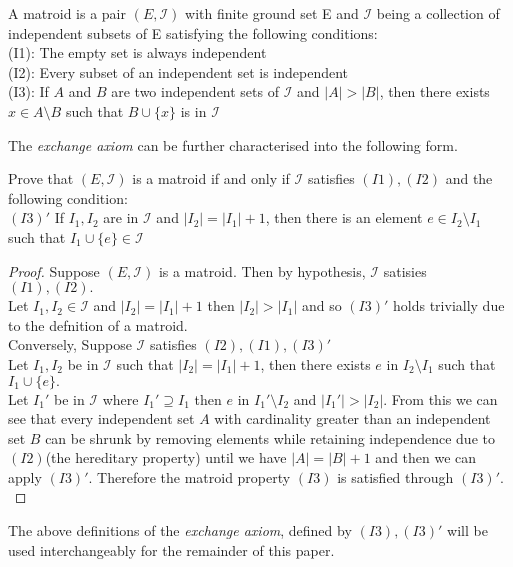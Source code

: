 \documentclass[../main.tex]{subfiles}
\begin{document}
\begin{defn}
A matroid is a pair $(E,\mathcal{I})$ with finite ground set E and $\mathcal{I}$ being a collection of independent subsets of E satisfying the following conditions:\\
\noindent (I1): The empty set is always independent\\
\noindent (I2): Every subset of an independent set is independent\\
\noindent (I3): If $ A $ and $ B $ are two independent sets of $\mathcal{I}$ and $|A|>|B|$, then there exists $x \in A \setminus B$ such that $B \cup \{ x \}$ is in $\mathcal{I}$
\end{defn}
The \textit{exchange axiom} can be further characterised into the following form.
\begin{lem}
Prove that $(E,\mathcal{I})$ is a matroid if and only if $\mathcal{I}$ satisfies $(I1), (I2)$ and the following condition:\\
\noindent $(I3)'$ If $I_1,I_2$ are in $\mathcal{I}$ and $|I_2|=|I_1|+1$, then there is an element $e \in I_2 \setminus I_1$ such that $I_1 \cup \{e\} \in \mathcal{I}$
\end{lem}
\begin{proof}
Suppose $(E,\mathcal{I})$ is a matroid. Then by hypothesis, $\mathcal{I}$ satisies $(I1),(I2).$\\
\noindent Let $I_1,I_2 \in \mathcal{I}$ and $|I_2|=|I_1|+1$ then $|I_2|>|I_1|$ and so $(I3)'$ holds trivially due to the defnition of a matroid.\\
Conversely, Suppose $\mathcal{I}$ satisfies $(I2),(I1),(I3)'$\\
Let $I_1,I_2$ be in $\mathcal{I}$ such that $|I_2|=|I_1|+1$, then there exists $e$ in $I_2 \setminus I_1$ such that $I_1 \cup \{e\}.$\\
Let $I_1'$ be in $\mathcal{I}$ where $I_1' \supseteq I_1$ then $e$ in $I_1' \setminus I_2$ and $|I_1'|>|I_2|.$ From this we can see that every independent set $A$ with cardinality greater than an independent set $B$ can be shrunk by removing elements while retaining independence due to $(I2)$(the hereditary property) until we have $|A|=|B|+1$ and then we can apply $(I3)'.$ Therefore the matroid property $(I3)$ is satisfied through $(I3)'.$
\end{proof}

\begin{note}
The above definitions of the \textit{exchange axiom}, defined by $(I3), (I3)'$ will be used interchangeably for the remainder of this paper.
\end{note}
\end{document}
